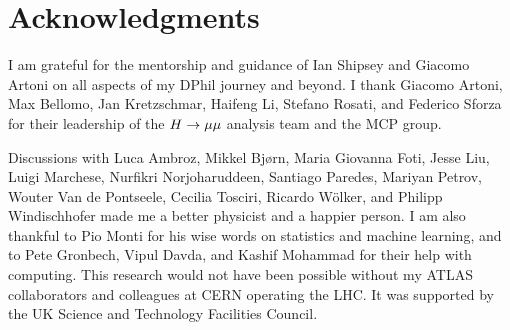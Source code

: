 \chapter*{Acknowledgments}

I am grateful for the mentorship and guidance of Ian Shipsey and Giacomo Artoni
on all aspects of my DPhil journey and beyond. I thank Giacomo Artoni, Max Bellomo,
Jan Kretzschmar, Haifeng Li, Stefano Rosati, and Federico Sforza for their leadership
of the $H \rightarrow \mu\mu$ analysis team and the MCP group.

Discussions with Luca Ambroz, Mikkel Bj{\o}rn, Maria Giovanna Foti, Jesse Liu, Luigi Marchese,
Nurfikri Norjoharuddeen, Santiago Paredes, Mariyan Petrov, Wouter Van de Pontseele,
Cecilia Tosciri, Ricardo W\"olker, and Philipp Windischhofer made me a better physicist
and a happier person. I am also thankful to Pio Monti for his wise words on statistics
and machine learning, and to Pete Gronbech, Vipul Davda, and Kashif Mohammad for their
help with computing. This research would not have been possible without my ATLAS collaborators
and colleagues at CERN operating the LHC. It was supported by the UK Science and
Technology Facilities Council.

